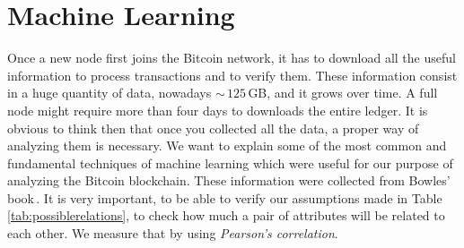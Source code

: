 \documentclass[USenglish]{uit-thesis}
\begin{document}
\section{Machine Learning}
\label{sec:machinelearning}
Once a new node first joins the Bitcoin network, it has to download
all the useful information to process transactions and to
verify them. These information consist in a huge quantity
of data, nowadays $\sim$\,$125$\,GB, and it grows over time.
A full node might require more than four days to 
downloads the entire ledger. It is obvious to think then that once you
collected all the data, a proper way of analyzing them is necessary.
We want to explain some of the most common and
fundamental techniques of machine learning which were
useful for our purpose of analyzing the Bitcoin blockchain.
These information were collected from Bowles' book\,\cite{bowles2015machine}.
It is very important, to be able to verify our assumptions made in
Table\,\ref{tab:possiblerelations}, to check how much
a pair of attributes will be related to each other.
We measure that by using \emph{Pearson's correlation}.
\end{document}
